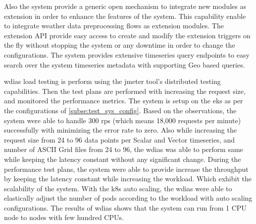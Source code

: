 Also the system provide a generic open mechanism to integrate new modules as extension in order to enhance the features of the system. This capability enable to integrate weather data preprocessing flows as extension modules.
The extension API provide easy access to create and modify the extension triggers on the fly without stopping the system or any downtime in order to change the configurations.
The system provides extensive timeseries query endpoints to easy search over the system timeseries metadata with supporting Geo based queries.

\acrshort{wdias} load testing is perform using the \acrshort{jmeter} tool's distributed testing capabilities. Then the test plans are performed with increasing the request size, and monitored the performance metrics. The system is setup on the \acrfull{eks} as per the configurations of \ref{subse:test_sys_config}. Based on the observations, the system were able to handle 300 \acrshort{rps} (which means 18,000 requests per minute) successfully with minimizing the error rate to zero. Also while increasing the request size from 24 to 96 data points per Scalar and Vector timeseries, and number of ASCII Grid files from 24 to 96, the \acrshort{wdias} was able to perform same while keeping the latency constant without any significant change.
During the performance test plans, the system were able to provide increase the throughput by keeping the latency constant while increasing the workload. Which exhibit the scalability of the system.
With the \acrshort{k8s} auto scaling, the \acrshort{wdias} were able to elastically adjust the number of pods according to the workload with auto scaling configurations. 
The results of \acrshort{wdias} shows that the system can run from 1 CPU node to nodes with few hundred CPUs.